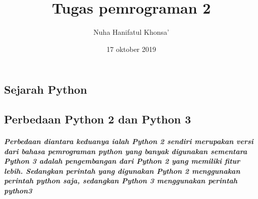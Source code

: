 \documentclass[a4paper,12pt]{report}
\title{Tugas pemrograman 2}
\author{Nuha Hanifatul Khonsa'}
\date{17 oktober 2019}
\begin{document}
\maketitle

\chapter{}
\section{Sejarah Python}
\usepackage{Pencipta bahasa pemrograman Python adalah Guido van Rossum di Centrum Wiskunde dan Informatica (CWI) di Belanda pada awal tahun 1990an. Bahasa Python sendiri terinspirasi dari bahasa pemrograman ABC.Bahasa Python sendiri bersifat open source sehingga dapat memungkinkan ribuan orang untuk dapat berkonstribusi dalam mengembangkannya.
Pada tahun 1995, Guido melanjutkan pembuatan Python di Corporation for National Research Initiative (CNRC) di Virginia Amerika. Lalu pada tahun 2000, Guido dan tim Python pindah ke BeOpen.com dan membentuk PythonLabs hingga pada tahun 2001 terbentuklah organisasi Python ialah Python Software Foundation(PSF.)
Python tersedia untuk berbagai macam system operasi seperti Unix(linux), PCs (DOS, Windows, OS/2) dan lainnya.
}

\section{Perbedaan Python 2 dan Python 3}
\usepackage{Ada 2 versi Python yang sering digunakan  saat ini pada lingkungan pengembangan dan produksi  yaitu Python 2 dan Python 3}
\paragraph{Perbedaan diantara keduanya ialah Python 2 sendiri merupakan versi dari bahasa pemrograman python yang banyak digunakan sementara Python 3 adalah pengembangan dari Python 2 yang memiliki fitur lebih. Sedangkan perintah yang digunakan Python 2 menggunakan perintah python saja, sedangkan Python 3 menggunakan perintah  python3}
\end{document}
